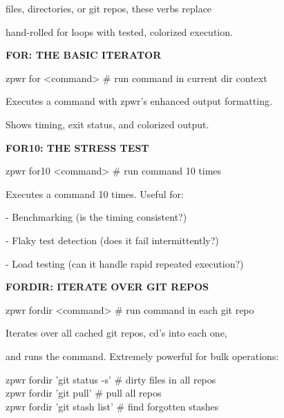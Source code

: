 \documentclass[11pt,a4paper,twoside]{book}
\begin{document}
\begin{codebox}
files, directories, or git repos, these verbs replace\\
\end{codebox}

hand-rolled for loops with tested, colorized execution.


\vspace{12pt}
{\bfseries\color{neonyellow} FOR: THE BASIC ITERATOR}\vspace{4pt}

\begin{codebox}
zpwr for <command>                  \# run command in current dir context\\
\end{codebox}

Executes a command with zpwr's enhanced output formatting.

Shows timing, exit status, and colorized output.


\vspace{12pt}
{\bfseries\color{neonyellow} FOR10: THE STRESS TEST}\vspace{4pt}

\begin{codebox}
zpwr for10 <command>                \# run command 10 times\\
\end{codebox}

Executes a command 10 times. Useful for:

- Benchmarking (is the timing consistent?)

- Flaky test detection (does it fail intermittently?)

- Load testing (can it handle rapid repeated execution?)


\vspace{12pt}
{\bfseries\color{neonyellow} FORDIR: ITERATE OVER GIT REPOS}\vspace{4pt}

\begin{codebox}
zpwr fordir <command>               \# run command in each git repo\\
\end{codebox}

Iterates over all cached git repos, cd's into each one,

and runs the command. Extremely powerful for bulk operations:

\begin{codebox}
zpwr fordir 'git status -s'         \# dirty files in all repos\\
zpwr fordir 'git pull'              \# pull all repos\\
zpwr fordir 'git stash list'        \# find forgotten stashes\\
\end{codebox}
\end{document}
